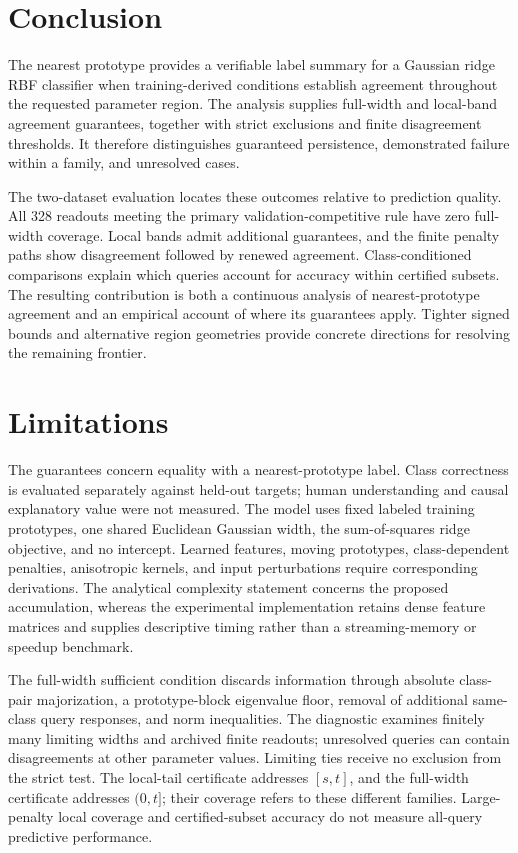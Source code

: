\documentclass[preprint,12pt,authoryear]{elsarticle}
\begin{document}
\section{Conclusion}
The nearest prototype provides a verifiable label summary for a Gaussian ridge RBF classifier when training-derived conditions establish agreement throughout the requested parameter region. The analysis supplies full-width and local-band agreement guarantees, together with strict exclusions and finite disagreement thresholds. It therefore distinguishes guaranteed persistence, demonstrated failure within a family, and unresolved cases.

The two-dataset evaluation locates these outcomes relative to prediction quality. All 328 readouts meeting the primary validation-competitive rule have zero full-width coverage. Local bands admit additional guarantees, and the finite penalty paths show disagreement followed by renewed agreement. Class-conditioned comparisons explain which queries account for accuracy within certified subsets. The resulting contribution is both a continuous analysis of nearest-prototype agreement and an empirical account of where its guarantees apply. Tighter signed bounds and alternative region geometries provide concrete directions for resolving the remaining frontier.

\section{Limitations}
The guarantees concern equality with a nearest-prototype label. Class correctness is evaluated separately against held-out targets; human understanding and causal explanatory value were not measured. The model uses fixed labeled training prototypes, one shared Euclidean Gaussian width, the sum-of-squares ridge objective, and no intercept. Learned features, moving prototypes, class-dependent penalties, anisotropic kernels, and input perturbations require corresponding derivations. The analytical complexity statement concerns the proposed accumulation, whereas the experimental implementation retains dense feature matrices and supplies descriptive timing rather than a streaming-memory or speedup benchmark.

The full-width sufficient condition discards information through absolute class-pair majorization, a prototype-block eigenvalue floor, removal of additional same-class query responses, and norm inequalities. The diagnostic examines finitely many limiting widths and archived finite readouts; unresolved queries can contain disagreements at other parameter values. Limiting ties receive no exclusion from the strict test. The local-tail certificate addresses $[s,t]$, and the full-width certificate addresses $(0,t]$; their coverage refers to these different families. Large-penalty local coverage and certified-subset accuracy do not measure all-query predictive performance.
\end{document}
